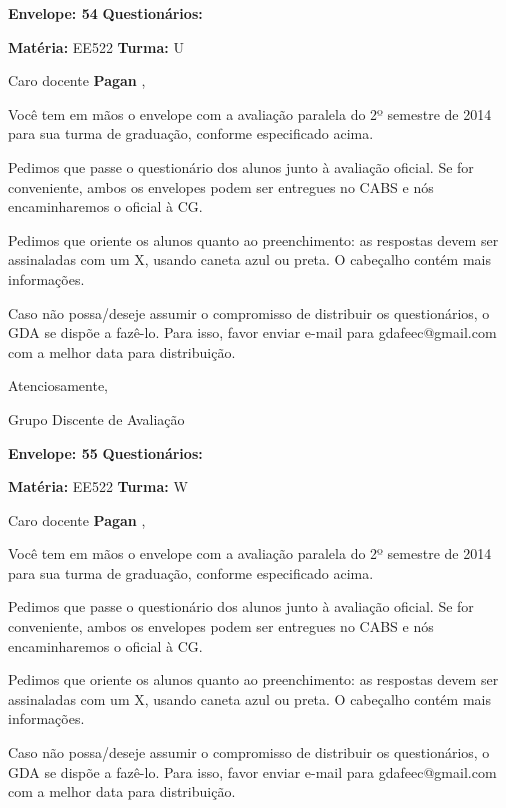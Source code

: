 \documentclass[a5paper]{letter}
\begin{document}
\vspace{0.5cm}

{\bf Envelope: 54 }		\hfill	{\bf Questionários:} \hspace{2cm}

\newpage
\thispagestyle{empty}

\hfill {\bf Matéria:} EE522 {\bf Turma:} U

Caro docente {\bf Pagan }, 

	Você tem em mãos o envelope com a avaliação paralela do 2º semestre de 2014 para sua turma de graduação, conforme especificado acima.

	Pedimos que passe o questionário dos alunos junto à avaliação oficial. Se for conveniente, ambos os envelopes podem ser entregues no CABS e nós encaminharemos o oficial à CG.

Pedimos que oriente os alunos quanto ao preenchimento: as respostas devem ser assinaladas com um X, usando caneta azul ou preta. O cabeçalho contém mais informações.

	Caso não possa/deseje assumir o compromisso de distribuir os questionários, o GDA se dispõe a fazê-lo. Para isso, favor enviar e-mail para gdafeec@gmail.com com a melhor data para distribuição.


Atenciosamente, 

Grupo Discente de Avaliação

\vspace{0.5cm}

{\bf Envelope: 55 }		\hfill	{\bf Questionários:} \hspace{2cm}

\newpage
\thispagestyle{empty}

\hfill {\bf Matéria:} EE522 {\bf Turma:} W

Caro docente {\bf Pagan }, 

	Você tem em mãos o envelope com a avaliação paralela do 2º semestre de 2014 para sua turma de graduação, conforme especificado acima.

	Pedimos que passe o questionário dos alunos junto à avaliação oficial. Se for conveniente, ambos os envelopes podem ser entregues no CABS e nós encaminharemos o oficial à CG.

Pedimos que oriente os alunos quanto ao preenchimento: as respostas devem ser assinaladas com um X, usando caneta azul ou preta. O cabeçalho contém mais informações.

	Caso não possa/deseje assumir o compromisso de distribuir os questionários, o GDA se dispõe a fazê-lo. Para isso, favor enviar e-mail para gdafeec@gmail.com com a melhor data para distribuição.
\end{document}
